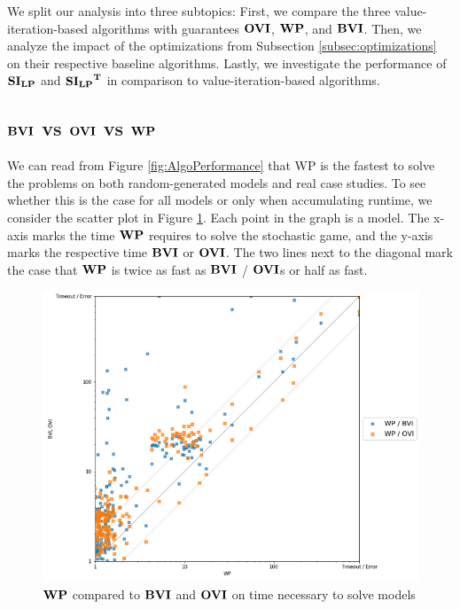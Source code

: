 We split our analysis into three subtopics: 
First, we compare the three value-iteration-based algorithms with guarantees $\OVI$, $\WP$, and $\BVI$. 
Then, we analyze the impact of the optimizations from Subsection \ref{subsec:optimizations} on their respective baseline algorithms.
Lastly, we investigate the performance of $\mathbf{SI_{LP}}$ and $\mathbf{\mathbf{SI_{LP}}^T}$ in comparison to value-iteration-based algorithms.


\subsection{$\BVI$ vs $\OVI$ vs $\WP$}
We can read from Figure \ref{fig:AlgoPerformance} that WP is the fastest to solve the problems on both random-generated models and real case studies.
To see whether this is the case for all models or only when accumulating runtime, we consider the scatter plot in Figure \ref{fig:WPvsBVIandOVIonRandomRandom}.
Each point in the graph is a model. The x-axis marks the time $\WP$ requires to solve the stochastic game, and the y-axis marks the respective time $\BVI$ or $\OVI$.
The two lines next to the diagonal mark the case that $\WP$ is twice as fast as $\BVI$ / $\OVI$s or half as fast.

\begin{figure}[t]
    \centering
    \includegraphics[width=1\textwidth]{figures/WPvsBVIandOVIonAll.png}
    \caption[$\WP$ compared to $\BVI$ and $\OVI$ on time necessary to solve models]{
        $\WP$ compared to $\BVI$ and $\OVI$ on time necessary to solve models
    }
    \label{fig:WPvsBVIandOVIonRandomRandom}
\end{figure}

